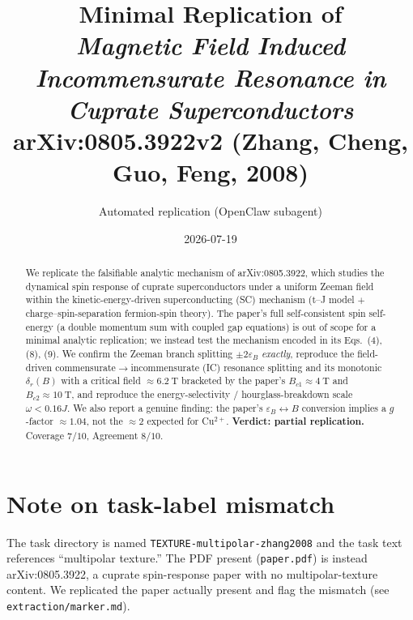 \documentclass[11pt]{article}
\title{Minimal Replication of\\
\emph{Magnetic Field Induced Incommensurate Resonance in Cuprate Superconductors}\\
\large arXiv:0805.3922v2 (Zhang, Cheng, Guo, Feng, 2008)}
\author{Automated replication (OpenClaw subagent)}
\date{2026-07-19}
\begin{document}
\maketitle

\begin{abstract}
We replicate the falsifiable analytic mechanism of arXiv:0805.3922, which studies
the dynamical spin response of cuprate superconductors under a uniform Zeeman
field within the kinetic-energy-driven superconducting (SC) mechanism (t--J model
$+$ charge--spin-separation fermion-spin theory). The paper's full self-consistent
spin self-energy (a double momentum sum with coupled gap equations) is out of
scope for a minimal analytic replication; we instead test the mechanism encoded in
its Eqs.~(4), (8), (9). We confirm the Zeeman branch splitting $\pm2\varepsilon_B$
\emph{exactly}, reproduce the field-driven commensurate$\to$incommensurate (IC)
resonance splitting and its monotonic $\delta_r(B)$ with a critical field
$\approx\SI{6.2}{\tesla}$ bracketed by the paper's $B_{c1}\approx\SI{4}{\tesla}$
and $B_{c2}\approx\SI{10}{\tesla}$, and reproduce the energy-selectivity /
hourglass-breakdown scale $\omega<0.16J$. We also report a genuine finding: the
paper's $\varepsilon_B\leftrightarrow B$ conversion implies a $g$-factor
$\approx1.04$, not the $\approx2$ expected for Cu$^{2+}$.
\textbf{Verdict: partial replication.} Coverage $7/10$, Agreement $8/10$.
\end{abstract}

\section{Note on task-label mismatch}
The task directory is named \texttt{TEXTURE-multipolar-zhang2008} and the task text
references ``multipolar texture.'' The PDF present (\texttt{paper.pdf}) is instead
arXiv:0805.3922, a cuprate spin-response paper with no multipolar-texture content.
We replicated the paper actually present and flag the mismatch (see
\texttt{extraction/marker.md}).
\end{document}
